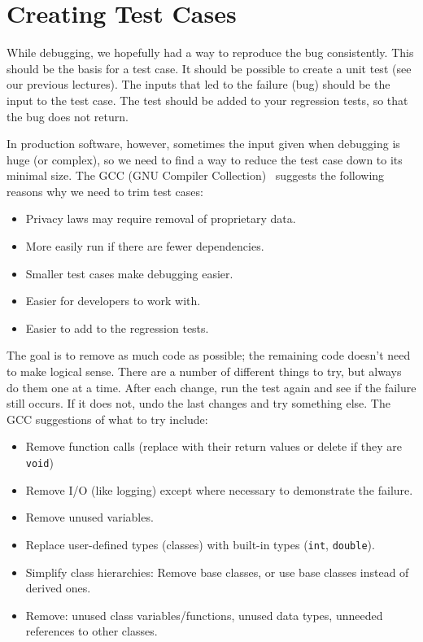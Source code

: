




\section*{Creating Test Cases}

While debugging, we hopefully had a way to reproduce the bug consistently. This should be the basis for a test case. It should be possible to create a unit test (see our previous lectures). The inputs that led to the failure (bug) should be the input to the test case. The test should be added to your regression tests, so that the bug does not return. 

In production software, however, sometimes the input given when debugging is huge (or complex), so we need to find a way to reduce the test case down to its minimal size. The GCC (GNU Compiler Collection)~\cite{fsf:bugs} suggests the following reasons why we need to trim test cases:

\begin{itemize}
	\item Privacy laws may require removal of proprietary data.
	\item More easily run if there are fewer dependencies.
	\item Smaller test cases make debugging easier.
	\item Easier for developers to work with.
	\item Easier to add to the regression tests.
\end{itemize}

The goal is to remove as much code as possible; the remaining code doesn't need to make logical sense. There are a number of different things to try, but always do them one at a time. After each change, run the test again and see if the failure still occurs. If it does not, undo the last changes and try something else. The GCC suggestions of what to try include:

\begin{itemize}
	\item Remove function calls (replace with their return values or delete if they are \texttt{void})
	\item Remove I/O (like logging) except where necessary to demonstrate the failure.
	\item Remove unused variables.
	\item Replace user-defined types (classes) with built-in types (\texttt{int}, \texttt{double}).
	\item Simplify class hierarchies: Remove base classes, or use base classes instead of derived ones.
	\item Remove: unused class variables/functions, unused data types, unneeded references to other classes.
\end{itemize}

